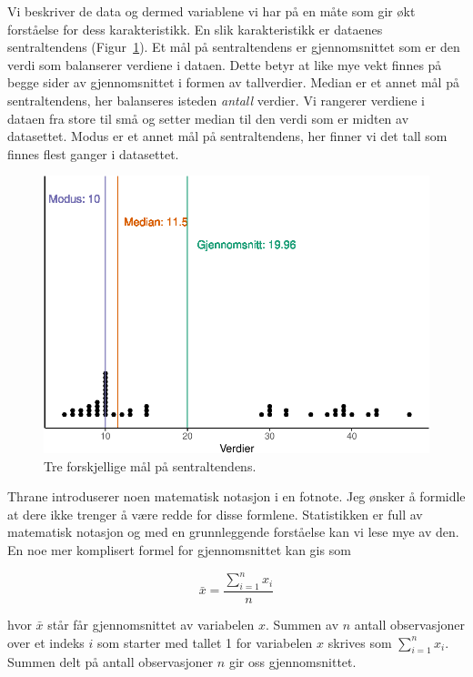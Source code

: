 \documentclass[
  letterpaper,
  DIV=11,
  numbers=noendperiod,
  oneside]{scrreprt}
\begin{document}
Vi beskriver de data og dermed variablene vi har på en måte som gir økt
forståelse for dess karakteristikk. En slik karakteristikk er dataenes
sentraltendens (Figur~\ref{fig-sentraltendens}). Et mål på
sentraltendens er gjennomsnittet som er den verdi som balanserer
verdiene i dataen. Dette betyr at like mye vekt finnes på begge sider av
gjennomsnittet i formen av tallverdier. Median er et annet mål på
sentraltendens, her balanseres isteden \emph{antall} verdier. Vi
rangerer verdiene i dataen fra store til små og setter median til den
verdi som er midten av datasettet. Modus er et annet mål på
sentraltendens, her finner vi det tall som finnes flest ganger i
datasettet.

\begin{figure}

{\centering \includegraphics{01-deskriptiv-dataanalyse_files/figure-pdf/fig-sentraltendens-1.pdf}

}

\caption{\label{fig-sentraltendens}Tre forskjellige mål på
sentraltendens.}

\end{figure}

Thrane introduserer noen matematisk notasjon i en fotnote. Jeg ønsker å
formidle at dere ikke trenger å være redde for disse formlene.
Statistikken er full av matematisk notasjon og med en grunnleggende
forståelse kan vi lese mye av den. En noe mer komplisert formel for
gjennomsnittet kan gis som

\[\bar{x} = \frac{\sum_{i=1}^{n}{x_i}}{n}\]

hvor \(\bar x\) står får gjennomsnittet av variabelen \(x\). Summen av
\(n\) antall observasjoner over et indeks \(i\) som starter med tallet 1
for variabelen \(x\) skrives som \(\sum_{i=1}^{n}{x_i}\). Summen delt på
antall observasjoner \(n\) gir oss gjennomsnittet.
\end{document}
